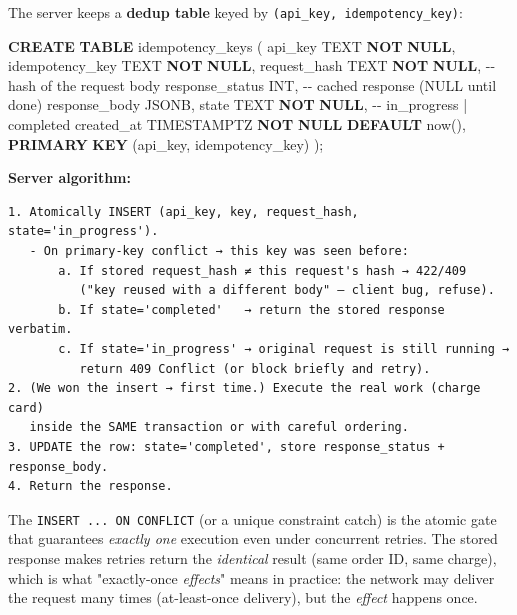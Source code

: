 \documentclass[11pt]{article}
\newenvironment{Shaded}{\begin{snugshade}}{\end{snugshade}}
\newcommand{\CommentTok}[1]{\textcolor[rgb]{0.48,0.49,0.49}{#1}}
\newcommand{\DataTypeTok}[1]{\textcolor[rgb]{0.16,0.50,0.73}{#1}}
\newcommand{\KeywordTok}[1]{\textcolor[rgb]{0.81,0.81,0.76}{\textbf{#1}}}
\newcommand{\NormalTok}[1]{\textcolor[rgb]{0.81,0.81,0.76}{#1}}
\begin{document}
The server keeps a \textbf{dedup table} keyed by \texttt{(api\_key,\ idempotency\_key)}:


\begin{Shaded}
\begin{Highlighting}[]
\KeywordTok{CREATE} \KeywordTok{TABLE}\NormalTok{ idempotency\_keys (}
\NormalTok{  api\_key          TEXT        }\KeywordTok{NOT} \KeywordTok{NULL}\NormalTok{,}
\NormalTok{  idempotency\_key  TEXT        }\KeywordTok{NOT} \KeywordTok{NULL}\NormalTok{,}
\NormalTok{  request\_hash     TEXT        }\KeywordTok{NOT} \KeywordTok{NULL}\NormalTok{,   }\CommentTok{{-}{-} hash of the request body}
\NormalTok{  response\_status  }\DataTypeTok{INT}\NormalTok{,                    }\CommentTok{{-}{-} cached response (NULL until done)}
\NormalTok{  response\_body    JSONB,}
\NormalTok{  state            TEXT        }\KeywordTok{NOT} \KeywordTok{NULL}\NormalTok{,    }\CommentTok{{-}{-} \textquotesingle{}in\_progress\textquotesingle{} | \textquotesingle{}completed\textquotesingle{}}
\NormalTok{  created\_at       TIMESTAMPTZ }\KeywordTok{NOT} \KeywordTok{NULL} \KeywordTok{DEFAULT}\NormalTok{ now(),}
  \KeywordTok{PRIMARY} \KeywordTok{KEY}\NormalTok{ (api\_key, idempotency\_key)}
\NormalTok{);}
\end{Highlighting}
\end{Shaded}

\textbf{Server algorithm:}

\setcodelang{}

\begin{verbatim}
1. Atomically INSERT (api_key, key, request_hash, state='in_progress').
   - On primary-key conflict → this key was seen before:
       a. If stored request_hash ≠ this request's hash → 422/409
          ("key reused with a different body" — client bug, refuse).
       b. If state='completed'   → return the stored response verbatim.
       c. If state='in_progress' → original request is still running →
          return 409 Conflict (or block briefly and retry).
2. (We won the insert → first time.) Execute the real work (charge card)
   inside the SAME transaction or with careful ordering.
3. UPDATE the row: state='completed', store response_status + response_body.
4. Return the response.
\end{verbatim}

The \texttt{INSERT\ ...\ ON\ CONFLICT} (or a unique constraint catch) is the atomic gate that guarantees \emph{exactly one} execution even under concurrent retries. The stored response makes retries return the \emph{identical} result (same order ID, same charge), which is what "exactly-once \emph{effects}" means in practice: the network may deliver the request many times (at-least-once delivery), but the \emph{effect} happens once.
\end{document}
